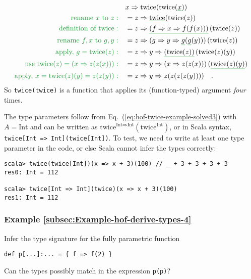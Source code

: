 \begin{align*}
 & x\Rightarrow\text{twice}(\text{twice}(\gunderline x))\\
{\color{greenunder}\text{rename }x\text{ to }z:}\quad & =z\Rightarrow\gunderline{\text{twice}}(\text{twice}(z))\\
{\color{greenunder}\text{definition of twice}:}\quad & =z\Rightarrow\gunderline{\left(f\Rightarrow x\Rightarrow f(f(x))\right)}\left(\text{twice}(z)\right)\\
{\color{greenunder}\text{rename }f,x\text{ to }g,y:}\quad & =z\Rightarrow(g\Rightarrow y\Rightarrow\gunderline g(\gunderline g(y)))\left(\text{twice}(z)\right)\\
{\color{greenunder}\text{apply, }g=\text{twice}(z):}\quad & =z\Rightarrow y\Rightarrow\gunderline{\left(\text{twice}(z)\right)}\left(\text{twice}(z)(y)\right)\\
{\color{greenunder}\text{use }\text{twice}(z)=\left(x\Rightarrow z(z(x))\right):}\quad & =z\Rightarrow y\Rightarrow\left(x\Rightarrow z(z(x))\right)(\gunderline{\text{twice}(z)(y)})\\
{\color{greenunder}\text{apply, }x=\text{twice}(z)(y)=z(z(y)):}\quad & =z\Rightarrow y\Rightarrow z(z(z(z(y))))\quad.
\end{align*}
So \lstinline!twice(twice)!
is a function that applies its (function-typed) argument \emph{four}
times.

The type parameters follow from Eq.~(\ref{eq:hof-twice-example-solved3})
with $A=\text{Int}$ and can be written as $\text{twice}^{\text{Int}\Rightarrow\text{Int}}(\text{twice}^{\text{Int}})$,
or in Scala syntax, \lstinline!twice[Int => Int](twice[Int])!.
To test, we need to write at least one type parameter in the code,
or else Scala cannot infer the types correctly:
\begin{lstlisting}
scala> twice(twice[Int])(x => x + 3)(100) // _ + 3 + 3 + 3 + 3
res0: Int = 112

scala> twice[Int => Int](twice)(x => x + 3)(100)
res1: Int = 112
\end{lstlisting}

\subsubsection{Example \label{subsec:Example-hof-derive-types-4}\ref{subsec:Example-hof-derive-types-4}}

Infer the type signature for the fully parametric function
\begin{lstlisting}
def p[...]:... = { f => f(2) }
\end{lstlisting}
Can the types possibly match in the expression \lstinline!p(p)!?

